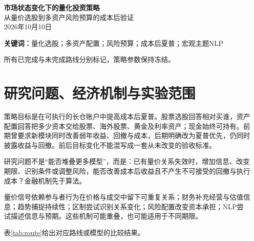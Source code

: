 \documentclass[12pt]{article}
\begin{document}
\begin{center}{\Large\bfseries 市场状态变化下的量化投资策略}\\[.5em]{\normalsize 从量价选股到多资产风险预算的成本后验证}\\[.5em]{\small 2026年10月10日}\end{center}
\begin{abstract}
本研究从历史沪深300股票池的量价选股出发，比较财务因子、趋势、状态切换、风险控制、新闻主题和注意力模型，再扩展到股票、标普500、黄金及国债的共享现金账户。E00股票基线在2024年收益39.49\%、2025年8.05\%，表明跨年度表现分化。最终风险预算候选RISK-B1在2024—2025年标准成本下累计收益27.80\%、零现金夏普2.858、最大回撤3.38\%；同对象固定25\%配置为46.13\%、2.642及5.55\%。B1提高单位波动收益并降低回撤，代价是绝对收益下降。2026年175日现金起点补充检验中，B1标准收益2.96\%、夏普0.446、最大回撤8.76\%，固定配置为0.52\%、0.122及10.22\%。结果为已查看历史上的探索比较。本文提供实际成交、费用及公司行为约束下的可复核策略与比较过程，不宣称全局最优或实盘保证。 股票、新闻、深度学习及配置分支按信息来源与评价时期分别比较；2023为开发验证，2024—2025为已观察探索，2026为部分年度的事后补充检验。注意力对配对MLP的局部优势与新闻当前预测的负结果均保留。主策略复现与扩展研究的复现范围分别列明。
\end{abstract}
\noindent\textbf{关键词：}量化选股；多资产配置；风险预算；成本后夏普；宏观主题NLP

所有已完成与未完成路线分别标记，策略参数保持冻结。


\section{研究问题、经济机制与实验范围}
策略目标是在可执行的长仓账户中提高成本后夏普。股票选股回答相对买谁，资产配置回答把多少资本交给股票、海外股票、黄金及利率资产；现金始终可持有。前期曾要求新模块同时改善弱年收益、回撤与成本，后期明确改为夏普优先，仍同时披露收益与回撤。前后目标变化不能混写成一套从未改变的验收标准。


研究问题不是“能否堆叠更多模型”，而是：已有量价关系失效时，增加信息、改变期限、识别条件或调整风险，能否改善成本后收益且不产生不可接受的回撤与执行成本？金融机制先于算法。

量价信号依赖参与者行为在价格与成交中留下可重复关系；财务补充经营与估值信息；趋势捕捉持续性；区制尝试识别关系变化；风险配置改变资本承担；NLP尝试描述信息与预期。这些机制可能重叠，也可能适用于不同期限。

表\ref{tab:route}给出对应路线或模型的比较结果。
\end{document}
